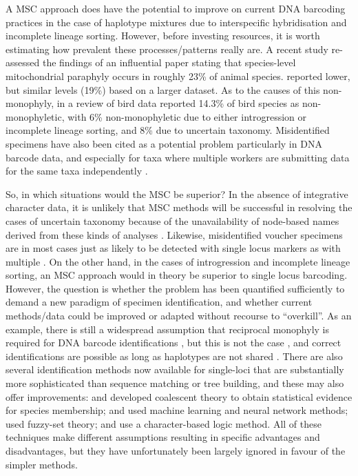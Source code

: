 \documentclass[12pt]{article}
\begin{document}
A MSC approach does have the potential to improve on current DNA barcoding practices in the case of haplotype mixtures due to interspecific hybridisation and incomplete lineage sorting. However, before investing resources, it is worth estimating how prevalent these processes/patterns really are. A recent study \citep{Ross2014} re-assessed the findings of an influential paper \citep{Funk2003} stating that species-level mitochondrial paraphyly occurs in roughly 23\% of animal species. \citeauthor{Ross2014} reported lower, but similar levels (19\%) based on a larger dataset. As to the causes of this non-monophyly, in a review of bird data \citep{McKay2010} reported 14.3\% of bird species as non-monophyletic, with 6\% non-monophyletic due to either introgression or incomplete lineage sorting, and 8\% due to uncertain taxonomy. Misidentified specimens have also been cited as a potential problem particularly in DNA barcode data, and especially for taxa where multiple workers are submitting data for the same taxa independently \citep{Collins2013}. 

So, in which situations would the MSC be superior? In the absence of integrative character data, it is unlikely that MSC methods will be successful in resolving the cases of uncertain taxonomy because of the unavailability of node-based names derived from these kinds of analyses \citep{Bauer2010}. Likewise, misidentified voucher specimens are in most cases just as likely to be detected with single locus markers as with multiple \citep{Becker2011,Ko2013}. On the other hand, in the cases of introgression and incomplete lineage sorting, an MSC approach would in theory be superior to single locus barcoding. However, the question is whether the problem has been quantified sufficiently to demand a new paradigm of specimen identification, and whether current methods/data could be improved or adapted without recourse to ``overkill''. As an example, there is still a widespread assumption that reciprocal monophyly is required for DNA barcode identifications \citep{Goldstein2011}, but this is not the case \citep{Meier2008}, and correct identifications are possible as long as haplotypes are not shared \citep{Meier2006}. There are also several identification methods now available for single-loci that are substantially more sophisticated than sequence matching or tree building, and these may also offer improvements: \citep{Nielsen2006} and \citep{Abdo2007} developed coalescent theory to obtain statistical evidence for species membership; \citep{Zhang2008} and \citep{Zhang2012a} used machine learning and neural network methods; \citep{Zhang2012b} used fuzzy-set theory; and \citep{Weitschek2013} use a character-based logic method. All of these techniques make different assumptions resulting in specific advantages and disadvantages, but they have unfortunately been largely ignored in favour of the simpler methods.
\end{document}
